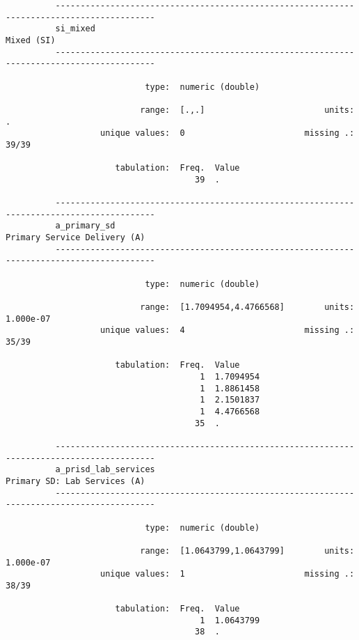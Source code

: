 \documentclass{article}
\begin{document}
\begin{verbatim}
          ------------------------------------------------------------------------------------------
          si_mixed                                                                        Mixed (SI)
          ------------------------------------------------------------------------------------------
          
                            type:  numeric (double)
          
                           range:  [.,.]                        units:  .
                   unique values:  0                        missing .:  39/39
          
                      tabulation:  Freq.  Value
                                      39  .
          
          ------------------------------------------------------------------------------------------
          a_primary_sd                                                  Primary Service Delivery (A)
          ------------------------------------------------------------------------------------------
          
                            type:  numeric (double)
          
                           range:  [1.7094954,4.4766568]        units:  1.000e-07
                   unique values:  4                        missing .:  35/39
          
                      tabulation:  Freq.  Value
                                       1  1.7094954
                                       1  1.8861458
                                       1  2.1501837
                                       1  4.4766568
                                      35  .
          
          ------------------------------------------------------------------------------------------
          a_prisd_lab_services                                          Primary SD: Lab Services (A)
          ------------------------------------------------------------------------------------------
          
                            type:  numeric (double)
          
                           range:  [1.0643799,1.0643799]        units:  1.000e-07
                   unique values:  1                        missing .:  38/39
          
                      tabulation:  Freq.  Value
                                       1  1.0643799
                                      38  .
          

\end{verbatim}
\end{document}

